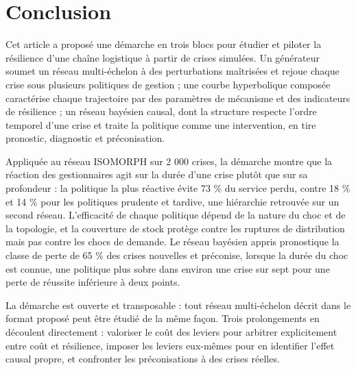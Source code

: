 
\section{Conclusion}
\label{sec:8}

Cet article a proposé une démarche en trois blocs pour étudier et piloter la résilience d'une chaîne logistique à partir de crises simulées. Un générateur soumet un réseau multi-échelon à des perturbations maîtrisées et rejoue chaque crise sous plusieurs politiques de gestion ; une courbe hyperbolique composée caractérise chaque trajectoire par des paramètres de mécanisme et des indicateurs de résilience ; un réseau bayésien causal, dont la structure respecte l'ordre temporel d'une crise et traite la politique comme une intervention, en tire pronostic, diagnostic et préconisation.

Appliquée au réseau ISOMORPH sur 2 000 crises, la démarche montre que la réaction des gestionnaires agit sur la durée d'une crise plutôt que sur sa profondeur : la politique la plus réactive évite 73 \% du service perdu, contre 18 \% et 14 \% pour les politiques prudente et tardive, une hiérarchie retrouvée sur un second réseau. L'efficacité de chaque politique dépend de la nature du choc et de la topologie, et la couverture de stock protège contre les ruptures de distribution mais pas contre les chocs de demande. Le réseau bayésien appris pronostique la classe de perte de 65 \% des crises nouvelles et préconise, lorsque la durée du choc est connue, une politique plus sobre dans environ une crise sur sept pour une perte de réussite inférieure à deux points.

La démarche est ouverte et transposable : tout réseau multi-échelon décrit dans le format proposé peut être étudié de la même façon. Trois prolongements en découlent directement : valoriser le coût des leviers pour arbitrer explicitement entre coût et résilience, imposer les leviers eux-mêmes pour en identifier l'effet causal propre, et confronter les préconisations à des crises réelles.
